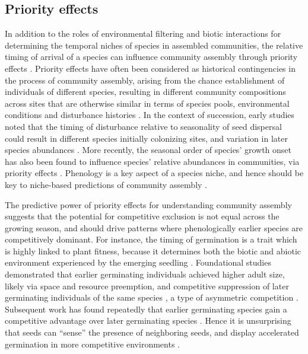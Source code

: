 \documentclass[11pt]{article}
\begin{document}
\subsection*{Priority effects}

In addition to the roles of environmental filtering and biotic interactions for determining the temporal niches of species in assembled communities, the relative timing of arrival of a species can influence community assembly through priority effects \citep{alford1985priority,chase2003community,fukami2015historical}. Priority effects have often been considered as historical contingencies in the process of community assembly, arising from the chance establishment of individuals of different species, resulting in different community compositions across sites that are otherwise similar in terms of species pools, environmental conditions and disturbance histories \citep[e.g.][]{diamond1975assembly}. In the context of succession, early studies noted that the timing of disturbance relative to seasonality of seed dispersal could result in different species initially colonizing sites, and variation in later species abundances \citep{keever1950causes,holt1972effect}. More recently, the seasonal order of species’ growth onset has also been found to influence species' relative abundances in communities, via priority effects \citep{fukami2015historical,wainwright2012seasonal,rudolf2019role}.  Phenology is a key aspect of a species niche, and hence should be key to niche-based predictions of community assembly \citep{vannette2014historical}.

The predictive power of priority effects for understanding community assembly suggests that the potential for competitive exclusion is not equal across the growing season, and should drive patterns where phenologically earlier species are competitively dominant. For instance, the timing of germination is a trait which is highly linked to plant fitness, because it determines both the biotic and abiotic environment experienced by the emerging seedling \citep{donohue2010germination}. Foundational studies demonstrated that earlier germinating individuals achieved higher adult size, likely via space and resource preemption, and competitive suppression of later germinating individuals of the same species \citep{ross1972occupation},  a type of asymmetric competition \citep{connolly1996asymmetric}. Subsequent work has found repeatedly that earlier germinating species gain a competitive advantage over later germinating species \citep{cleland2015priority,waterton2016trade,blackford2020species}. Hence it is unsurprising that seeds can “sense” the presence of neighboring seeds, and display accelerated germination in more competitive environments \citep{dyer2000accelerated}.
\end{document}
